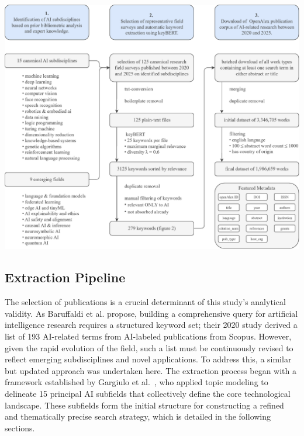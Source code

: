 \documentclass{article}
\begin{document}
\includegraphics[width=\textwidth]{data_extraction_pipeline_diagram.pdf}
\label{fig:log_bar_graph}

\twocolumn          %




\subsection*{Extraction Pipeline}

The selection of publications is a crucial determinant of this study’s analytical validity. As Baruffaldi et al. propose, building a comprehensive query for artificial intelligence research requires a structured keyword set; their 2020 study derived a list of 193 AI-related terms from AI-labeled publications from Scopus. \cite{baruffaldi2020identifying} However, given the rapid evolution of the field, such a list must be continuously revised to reflect emerging subdisciplines and novel applications. To address this, a similar but updated approach was undertaken here. The extraction process began with a framework established by Gargiulo et al.\ \cite{gargiulo2022cartography}, who applied topic modeling to delineate 15 principal AI subfields that collectively define the core technological landscape. These subfields form the initial structure for constructing a refined and thematically precise search strategy, which is detailed in the following sections.
\end{document}
